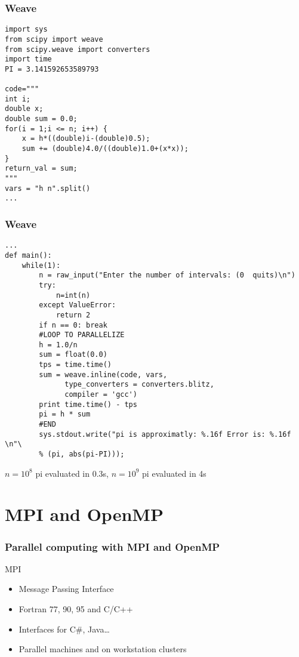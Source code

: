 \documentclass[12pt]{beamer}
\begin{document}
\begin{frame}[fragile]
  \frametitle{Weave}
      \begin{verbatim}
import sys
from scipy import weave
from scipy.weave import converters
import time
PI = 3.141592653589793

code="""
int i;
double x;
double sum = 0.0;
for(i = 1;i <= n; i++) {
    x = h*((double)i-(double)0.5);
    sum += (double)4.0/((double)1.0+(x*x));
}
return_val = sum;
"""
vars = "h n".split()
...
      \end{verbatim}
\end{frame}

\begin{frame}[fragile]
  \frametitle{Weave}
      \begin{verbatim}
...
def main():
    while(1):
        n = raw_input("Enter the number of intervals: (0  quits)\n")
        try:
            n=int(n)
        except ValueError:
            return 2
        if n == 0: break
        #LOOP TO PARALLELIZE
        h = 1.0/n
        sum = float(0.0)
        tps = time.time()
        sum = weave.inline(code, vars, 
              type_converters = converters.blitz, 
              compiler = 'gcc')
        print time.time() - tps
        pi = h * sum
        #END
        sys.stdout.write("pi is approximatly: %.16f Error is: %.16f \n"\
        % (pi, abs(pi-PI)));
      \end{verbatim}
$n = 10^8$ pi evaluated in 0.3s, $n = 10^9$ pi evaluated in 4s
\end{frame}

\section{MPI and OpenMP}
\begin{frame}
  \begin{block}{}
  \end{block}
\end{frame}

\begin{frame}
  \frametitle{Parallel computing with MPI and OpenMP}
  \begin{block}{MPI}
    \begin{itemize}[<+->]
    \item Message Passing Interface
    \item Fortran 77, 90, 95 and C/C++
    \item Interfaces for C\#, Java\dots
    \item Parallel machines and on workstation clusters
    \end{itemize}
  \end{block}
\end{frame}
\end{document}
